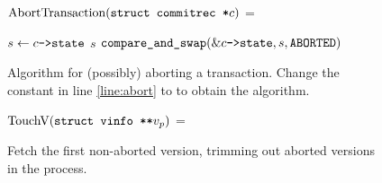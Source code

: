 \documentclass[11pt,notitlepage]{article}
\newcommand{\ptr}{\code{->}}
\newcommand{\codesize}{\scriptsize}
\begin{document}
\begin{figure}
$\text{AbortTransaction}(\texttt{struct commitrec *} c)$ =
\begin{myalgorithmic}
  \RETURN {}
\ENDIF
\LOOP
  \STATE $s \gets c\ptr\code{state}$
    \RETURN $s$
  \ENDIF
  \STATE $\code{compare\_and\_swap}(\&c\ptr\code{state}, s, \code{ABORTED})$
         \label{line:abort}
\ENDLOOP*
\end{myalgorithmic}
\caption{Algorithm for (possibly) aborting a transaction.
         Change the constant  in line \ref{line:abort}
         to  to obtain the  algorithm.}
\label{fig:aborttrans}
\end{figure}

\begin{figure}
$\text{TouchV}(\texttt{struct vinfo **} v_p)$ =
\begin{myalgorithmic}
\STATE
\end{myalgorithmic}
\caption{Fetch the first non-aborted version, trimming out aborted
         versions in the process.}
\label{fig:touchv}
\end{figure}




\end{document}
